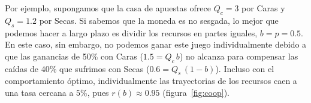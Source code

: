\documentclass[a4paper,11pt]{book}
\theoremstyle{definition}
\begin{document}

Por ejemplo, supongamos que la casa de apuestas ofrece $Q_c = 3$ por Caras y $Q_s = 1.2$ por Secas.
%
Si sabemos que la moneda es no sesgada, lo mejor que podemos hacer a largo plazo es dividir los recursos en partes iguales, $b = p = 0.5$.
En este caso, sin embargo, no podemos ganar este juego individualmente debido a que las ganancias de 50\% con Caras ($1.5 = Q_c \, b$) no alcanza para compensar las caídas de 40\% que sufrimos con Secas ($0.6 = Q_s \, (1-b)$).
%
Incluso con el comportamiento óptimo, individualmente las trayectorias de los recursos caen a una tasa cercana a $5\%$, pues $r(b) \approx 0.95$ (figura~\ref{fig:coop}).

\end{document}
